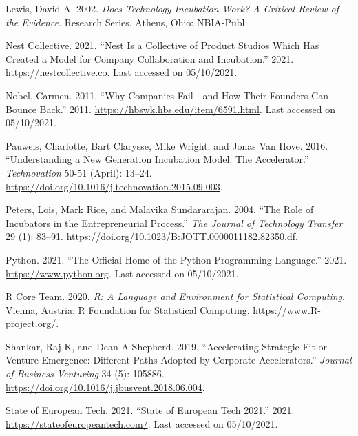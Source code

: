 \documentclass[
  12pt,
]{article}
\newlength{\cslhangindent}
\newlength{\cslentryspacingunit} %
\newenvironment{CSLReferences}[2] %
 {%
  \setlength{\parindent}{0pt}
  \ifodd #1
  \let\oldpar\par
  \def\par{\hangindent=\cslhangindent\oldpar}
  \fi
  \setlength{\parskip}{#2\cslentryspacingunit}
 }%
 {}
\begin{document}
\begin{CSLReferences}{1}{0}
\leavevmode{}%
Lewis, David A. 2002. \emph{Does Technology Incubation Work? A Critical Review of the Evidence}. Research Series. Athens, Ohio: NBIA-Publ.

\leavevmode{}%
Nest Collective. 2021. {``Nest Is a Collective of Product Studios Which Has Created a Model for Company Collaboration and Incubation.''} 2021. \url{https://nestcollective.co}. Last accessed on 05/10/2021.

\leavevmode{}%
Nobel, Carmen. 2011. {``Why Companies Fail---and How Their Founders Can Bounce Back.''} 2011. \url{https://hbswk.hbs.edu/item/6591.html}. Last accessed on 05/10/2021.

\leavevmode{}%
Pauwels, Charlotte, Bart Clarysse, Mike Wright, and Jonas Van Hove. 2016. {``Understanding a New Generation Incubation Model: {The} Accelerator.''} \emph{Technovation} 50-51 (April): 13--24. \url{https://doi.org/10.1016/j.technovation.2015.09.003}.

\leavevmode{}%
Peters, Lois, Mark Rice, and Malavika Sundararajan. 2004. {``The Role of Incubators in the Entrepreneurial Process.''} \emph{The Journal of Technology Transfer} 29 (1): 83--91. \url{https://doi.org/10.1023/B:JOTT.0000011182.82350.df}.

\leavevmode{}%
Python. 2021. {``The Official Home of the Python Programming Language.''} 2021. \url{https://www.python.org}. Last accessed on 05/10/2021.

\leavevmode{}%
R Core Team. 2020. \emph{R: A Language and Environment for Statistical Computing}. Vienna, Austria: R Foundation for Statistical Computing. \url{https://www.R-project.org/}.

\leavevmode{}%
Shankar, Raj K, and Dean A Shepherd. 2019. {``Accelerating Strategic Fit or Venture Emergence: Different Paths Adopted by Corporate Accelerators.''} \emph{Journal of Business Venturing} 34 (5): 105886. \url{https://doi.org/10.1016/j.jbusvent.2018.06.004}.

\leavevmode{}%
State of European Tech. 2021. {``State of European Tech 2021.''} 2021. \url{https://stateofeuropeantech.com/}. Last accessed on 05/10/2021.


\end{CSLReferences}
\end{document}
